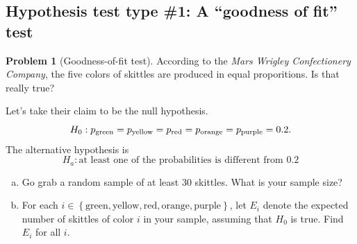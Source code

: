 \documentclass[10pt]{amsart}
\theoremstyle{definition}
\newtheorem{problem}[theorem]{Problem}
\newcommand{\1}[1]{\textbf{1}_{\left[#1\right]}} %
\begin{document}
\subsection{Hypothesis test type \#1: A ``goodness of fit'' test}


\vspace{1em}
\begin{problem}[Goodness-of-fit test]
  According to the \textit{Mars Wrigley Confectionery Company}, the five
  colors of skittles are produced in equal proporitions. Is that really true?
  

  Let's take their claim to be the null hypothesis.
  \begin{equation*}
    H_{0}: p_{\rm green} = p_{\rm yellow}=p_{\rm red} = p_{\rm orange} = p_{\rm purple} = 0.2.
  \end{equation*}
  The alternative hypothesis is
  \begin{equation*}
    H_{a}: \text{at least one of the probabilities is different from $0.2$}
  \end{equation*}

  \begin{enumerate}[(a)]
    \setlength{\itemsep}{1em}
    \item Go grab a random sample of at least 30 skittles. What is your sample
    size?

    \item For each
    $i\in \left\{\text{green}, \text{yellow}, \text{red}, \text{orange},
      \text{purple}\right\}$, let $E_{i}$ denote the expected number of
    skittles of color $i$ in your sample, assuming that $H_{0}$ is true. Find
    $E_{i}$ for all $i$.
    

\end{enumerate}
\end{problem}
\end{document}
